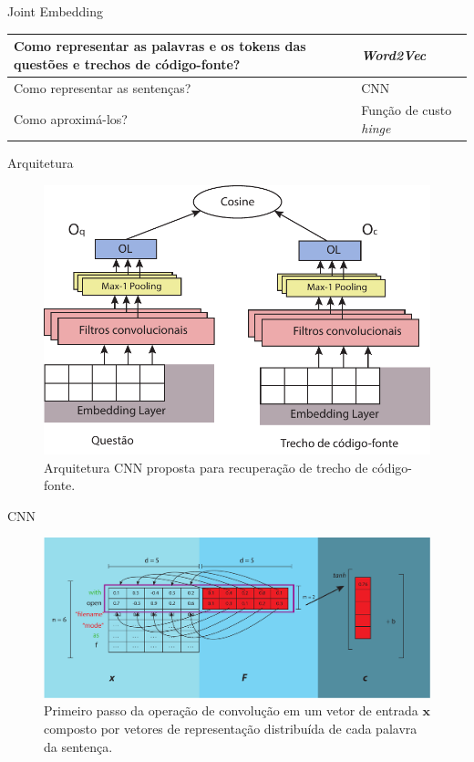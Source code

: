 \documentclass[10pt]{beamer}
\begin{document}
\begin{frame}{Joint Embedding}
   \begin{center}
       \begin{tabular}{|p{4cm}|p{4cm}|}
            \hline
            Como representar as palavras e os tokens das questões e trechos de código-fonte? & \textit{Word2Vec} \\ 
            \hline
            Como representar as sentenças? &  CNN \\
            \hline
            Como aproximá-los? &  Função de custo \textit{hinge} \\
            \hline
       \end{tabular}
   \end{center}
\end{frame}

\begin{frame}{Arquitetura}
	\begin{figure}[h]
        \centering
        \includegraphics[width=0.8\linewidth]{figuras/cnn-architecture-proposal.pdf}
        \caption{Arquitetura CNN proposta para recuperação de trecho de código-fonte.}
        \label{fig:cnn-architecture-proposal}
    \end{figure}
\end{frame}


\begin{frame}{CNN}
	\begin{figure}[h]
        \centering
        \includegraphics[width=1\linewidth]{figuras/first-step-convolution.pdf}
        \caption{Primeiro passo da operação de convolução em um vetor de entrada $\bm{x}$ composto por vetores de representação distribuída de cada palavra da sentença. }
        \label{fig:first-step-convolution}
    \end{figure}
\end{frame}
\end{document}
